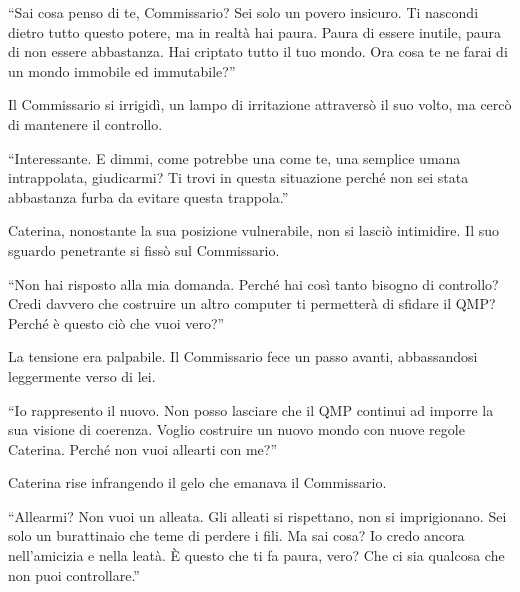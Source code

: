 \begin{dialogue}
 \enquote{Sai cosa penso di te, Commissario? Sei solo un povero insicuro. Ti nascondi dietro tutto questo potere, ma in realtà hai paura. Paura di essere inutile, paura di non essere abbastanza. Hai criptato tutto il tuo mondo. Ora cosa te ne farai di un mondo immobile ed immutabile?}
\end{dialogue}

Il Commissario si irrigidì, un lampo di irritazione attraversò il suo volto, ma cercò di mantenere il controllo.

\begin{dialogue}
 \enquote{Interessante. E dimmi, come potrebbe una come te, una semplice umana intrappolata, giudicarmi? Ti trovi in questa situazione perché non sei stata abbastanza furba da evitare questa trappola.}
\end{dialogue}

Caterina, nonostante la sua posizione vulnerabile, non si lasciò intimidire. Il suo sguardo penetrante si fissò sul Commissario.

\begin{dialogue}
 \enquote{Non hai risposto alla mia domanda. Perché hai così tanto bisogno di controllo? Credi davvero che costruire un altro computer ti permetterà di sfidare il QMP? Perché è questo ciò che vuoi vero?}
\end{dialogue}

La tensione era palpabile. Il Commissario fece un passo avanti, abbassandosi leggermente verso di lei.

\begin{dialogue}
 \enquote{Io rappresento il nuovo. Non posso lasciare che il QMP continui ad imporre la sua visione di coerenza. Voglio costruire un nuovo mondo con nuove regole Caterina. Perché non vuoi allearti con me?}
\end{dialogue}

Caterina rise infrangendo  il gelo che emanava il Commissario.

\begin{dialogue}
 \enquote{Allearmi? Non vuoi un alleata. Gli alleati si rispettano, non si imprigionano. Sei solo un burattinaio che teme di perdere i fili. Ma sai cosa? Io credo ancora nell'amicizia e nella leatà.  È questo che ti fa paura, vero? Che ci sia qualcosa che non puoi controllare.}
\end{dialogue}

